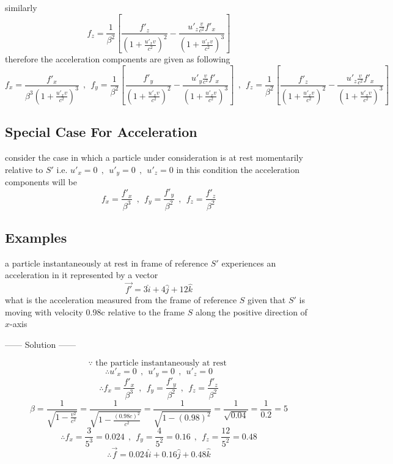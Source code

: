 \documentclass{article}
\begin{document}
similarly
\[
    f_z = \frac{1}{\beta^2} \left[ \frac{f'_z}{{\left(1+\frac{u'_x v }{c^2}\right)}^2} - \frac{u'_z\frac{v}{c^2}f'_x}{{\left(1 + \frac{u'_x v}{c^2}\right)}^3}\right]
\]
therefore the acceleration components are given as following
\[
f_x = \frac{f'_x}{\beta^3{\left(1 + \frac{u'_x v}{c^2}\right)}^3}
\ \ , \ \ 
f_y =\frac{1}{\beta^2} \left[ \frac{f'_y}{{\left(1+\frac{u'_x v }{c^2}\right)}^2} - \frac{u'_y\frac{v}{c^2}f'_x}{{\left(1 + \frac{u'_x v}{c^2}\right)}^3}\right]
\ \ , \ \ 
f_z = \frac{1}{\beta^2} \left[ \frac{f'_z}{{\left(1+\frac{u'_x v }{c^2}\right)}^2} - \frac{u'_z\frac{v}{c^2}f'_x}{{\left(1 + \frac{u'_x v}{c^2}\right)}^3}\right]
\]
\subsection{Special Case For Acceleration}
consider the case in which a particle under consideration is at rest momentarily relative to $S'$ i.e. 
$
u'_x =0
\ \ , \ \ 
u'_y =0
\ \ , \ \ 
u'_z =0
$
in this condition the acceleration components will be 
\[
f_x =\frac{f'_x}{\beta^3}
\ \ , \ \ 
f_y =\frac{f'_y}{\beta^2}
\ \ , \ \ 
f_z =\frac{f'_z}{\beta^2}
\]
\subsection{Examples}
\begin{example}
a particle instantaneously at rest in frame of reference $S'$ experiences an acceleration in it represented by a vector 
\[
\vec{f'} = 3 \hat{i} + 4\hat{j} + 12\hat{k}
\]
what is the acceleration measured from the frame of reference $S$ given that $S'$ is moving with velocity 0.98c relative to the frame $S$ along the positive direction of $x$-axis
\begin{center}
    ------ \textcolor{Solution}{Solution} ------
\end{center}
\[
    \because \text{ the particle instantaneously at rest }    
\]
\[
\therefore
u'_x =0
\ \ , \ \ 
u'_y =0
\ \ , \ \ 
u'_z =0
\]
\[
\therefore
f_x =\frac{f'_x}{\beta^3}
\ \ , \ \ 
f_y =\frac{f'_y}{\beta^2}
\ \ , \ \ 
f_z =\frac{f'_z}{\beta^2}
\]
\[
\beta = \frac{1}{\sqrt{1-\frac{v^2}{c^2}}} =  \frac{1}{\sqrt{1-\frac{{(0.98c)}^2}{c^2}}} = \frac{1}{\sqrt{1-{(0.98)}^2}} = \frac{1}{\sqrt{0.04}} = \frac{1}{0.2} = 5
\]
\[
\therefore   
f_x =\frac{3}{5^3} =0.024
\ \ , \ \ 
f_y =\frac{4}{5^2} =0.16
\ \ , \ \ 
f_z =\frac{12}{5^2} = 0.48
\]
\[
\therefore \vec{f} = 0.024 \hat{i} + 0.16 \hat{j} + 0.48\hat{k}
\]
\end{example}
\end{document}

